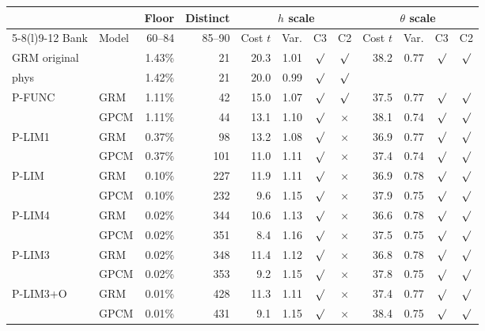 \begin{center}\footnotesize\setlength{\tabcolsep}{4pt}
\begin{tabular}{@{}llrrrrccrrcc@{}}
\toprule
 & & Floor & Distinct & \multicolumn{4}{c}{$h$ scale} & \multicolumn{4}{c}{$\theta$ scale} \\
\cmidrule(lr){5-8}\cmidrule(l){9-12}
Bank & Model & 60--84 & 85--90 & Cost $t$ & Var. & C3 & C2 & Cost $t$ & Var. & C3 & C2 \\
\midrule
GRM original & & 1.43\% & 21 & 20.3 & 1.01 & $\surd$ & $\surd$ & 38.2 & 0.77 & $\surd$ & $\surd$ \\
phys & & 1.42\% & 21 & 20.0 & 0.99 & $\surd$ & $\surd$ &  & & & \\
\midrule
P-FUNC & GRM & 1.11\% & 42 & 15.0 & 1.07 & $\surd$ & $\surd$ & 37.5 & 0.77 & $\surd$ & $\surd$ \\
 & GPCM & 1.11\% & 44 & 13.1 & 1.10 & $\surd$ & $\times$ & 38.1 & 0.74 & $\surd$ & $\surd$ \\
P-LIM1 & GRM & 0.37\% & 98 & 13.2 & 1.08 & $\surd$ & $\times$ & 36.9 & 0.77 & $\surd$ & $\surd$ \\
 & GPCM & 0.37\% & 101 & 11.0 & 1.11 & $\surd$ & $\times$ & 37.4 & 0.74 & $\surd$ & $\surd$ \\
P-LIM & GRM & 0.10\% & 227 & 11.9 & 1.11 & $\surd$ & $\times$ & 36.9 & 0.78 & $\surd$ & $\surd$ \\
 & GPCM & 0.10\% & 232 & 9.6 & 1.15 & $\surd$ & $\times$ & 37.9 & 0.75 & $\surd$ & $\surd$ \\
P-LIM4 & GRM & 0.02\% & 344 & 10.6 & 1.13 & $\surd$ & $\times$ & 36.6 & 0.78 & $\surd$ & $\surd$ \\
 & GPCM & 0.02\% & 351 & 8.4 & 1.16 & $\surd$ & $\times$ & 37.5 & 0.75 & $\surd$ & $\surd$ \\
P-LIM3 & GRM & 0.02\% & 348 & 11.4 & 1.12 & $\surd$ & $\times$ & 36.8 & 0.78 & $\surd$ & $\surd$ \\
 & GPCM & 0.02\% & 353 & 9.2 & 1.15 & $\surd$ & $\times$ & 37.8 & 0.75 & $\surd$ & $\surd$ \\
P-LIM3+O & GRM & 0.01\% & 428 & 11.3 & 1.11 & $\surd$ & $\times$ & 37.4 & 0.77 & $\surd$ & $\surd$ \\
 & GPCM & 0.01\% & 431 & 9.1 & 1.15 & $\surd$ & $\times$ & 38.4 & 0.75 & $\surd$ & $\surd$ \\
\bottomrule
\end{tabular}
\end{center}
